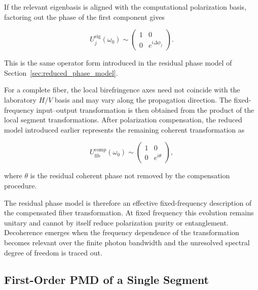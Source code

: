 If the relevant eigenbasis is aligned with the computational polarization basis,
factoring out the phase of the first component gives

\begin{equation}
U_j^{\mathrm{eig}}(\omega_0)
\sim
\begin{pmatrix}
1 & 0\\
0 & e^{i\Delta\phi_j}
\end{pmatrix}.
\label{eq:fixed_frequency_reduced_phase_form}
\end{equation}

This is the same operator form introduced in the residual phase model of
Section~\ref{sec:reduced_phase_model}.

For a complete fiber, the local birefringence axes need not coincide with the
laboratory \(H/V\) basis and may vary along the propagation direction. The
fixed-frequency input--output transformation is then obtained from the product of
the local segment transformations. After polarization compensation, the reduced
model introduced earlier represents the remaining coherent transformation as

\begin{equation}
U_{\mathrm{fib}}^{\mathrm{comp}}(\omega_0)
\sim
\begin{pmatrix}
1 & 0\\
0 & e^{i\theta}
\end{pmatrix},
\label{eq:compensated_complete_fiber_reduced_operator}
\end{equation}

where \(\theta\) is the residual coherent phase not removed by the compensation
procedure.

The residual phase model is therefore an effective fixed-frequency description of
the compensated fiber transformation. At fixed frequency this evolution remains
unitary and cannot by itself reduce polarization purity or entanglement.
Decoherence emerges when the frequency dependence of the transformation becomes
relevant over the finite photon bandwidth and the unresolved spectral degree of
freedom is traced out.


\subsection{First-Order PMD of a Single Segment}
\label{subsec:first_order_single_segment_pmd}

